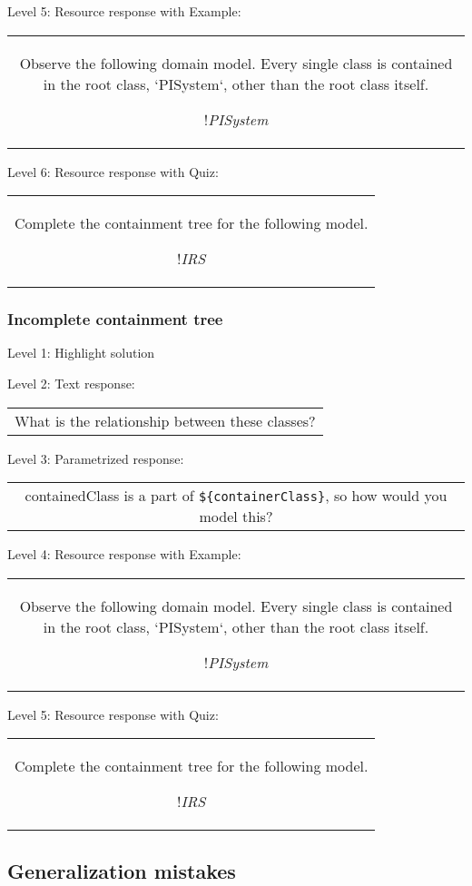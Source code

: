 \noindent Level 5: Resource response with Example:

\begin{tabular}{|c}
Observe the following domain model. Every single class is contained in the 
root class, `PISystem`, other than the root class itself.

!\textit{PISystem}
\end{tabular} \medskip

\noindent Level 6: Resource response with Quiz:

\begin{tabular}{|c}
Complete the containment tree for the following model.

!\textit{IRS}
\end{tabular} \medskip


\subsubsection{Incomplete containment tree}

\noindent Level 1: Highlight solution \medskip

\noindent Level 2: Text response: \medskip

\begin{tabular}{|c}
What is the relationship between these classes?
\end{tabular} \medskip

\noindent Level 3: Parametrized response: \medskip

\begin{tabular}{|c}
{containedClass} is a part of \verb|${containerClass}|, so how would you model this?
\end{tabular} \medskip

\noindent Level 4: Resource response with Example:

\begin{tabular}{|c}
Observe the following domain model. Every single class is contained in the 
root class, `PISystem`, other than the root class itself.

!\textit{PISystem}
\end{tabular} \medskip

\noindent Level 5: Resource response with Quiz:

\begin{tabular}{|c}
Complete the containment tree for the following model.

!\textit{IRS}
\end{tabular} \medskip


\subsection{Generalization mistakes}

